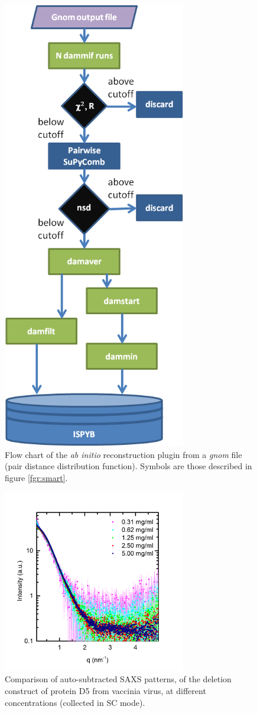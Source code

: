 \documentclass[preprint,pdf]{iucr}              %
\begin{document}
\begin{figure}
\centering
\includegraphics[width=8cm]{model.png}
\caption{Flow chart of the \textit{ab initio} reconstruction plugin from a
\textit{gnom} file (pair distance distribution function).
Symbols are those described in figure \ref{fgr:smart}.}\label{fgr:analysis}
\label{fgr:modelling}
\end{figure}

\begin{figure}
\centering
\includegraphics[width=8cm]{SCcurves.png}
\caption{Comparison of auto-subtracted SAXS patterns, of the deletion
construct of protein D5 from vaccinia virus, at different concentrations
(collected in SC mode).}
\label{fgr:SCcurves}
\end{figure}
\end{document}
